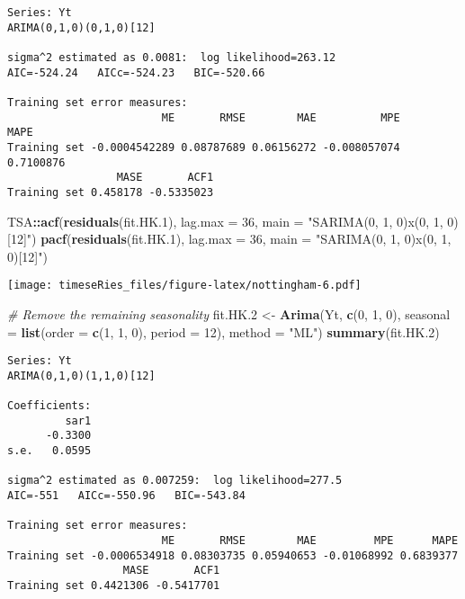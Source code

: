\documentclass[]{book}
\newenvironment{Shaded}{\begin{snugshade}}{\end{snugshade}}
\newcommand{\KeywordTok}[1]{\textcolor[rgb]{0.13,0.29,0.53}{\textbf{#1}}}
\newcommand{\DataTypeTok}[1]{\textcolor[rgb]{0.13,0.29,0.53}{#1}}
\newcommand{\DecValTok}[1]{\textcolor[rgb]{0.00,0.00,0.81}{#1}}
\newcommand{\StringTok}[1]{\textcolor[rgb]{0.31,0.60,0.02}{#1}}
\newcommand{\CommentTok}[1]{\textcolor[rgb]{0.56,0.35,0.01}{\textit{#1}}}
\newcommand{\OperatorTok}[1]{\textcolor[rgb]{0.81,0.36,0.00}{\textbf{#1}}}
\newcommand{\NormalTok}[1]{#1}
\begin{document}
\begin{verbatim}
Series: Yt 
ARIMA(0,1,0)(0,1,0)[12] 

sigma^2 estimated as 0.0081:  log likelihood=263.12
AIC=-524.24   AICc=-524.23   BIC=-520.66

Training set error measures:
                        ME       RMSE        MAE          MPE      MAPE
Training set -0.0004542289 0.08787689 0.06156272 -0.008057074 0.7100876
                 MASE       ACF1
Training set 0.458178 -0.5335023
\end{verbatim}

\begin{Shaded}
\begin{Highlighting}[]
\NormalTok{TSA}\OperatorTok{::}\KeywordTok{acf}\NormalTok{(}\KeywordTok{residuals}\NormalTok{(fit.HK.}\DecValTok{1}\NormalTok{), }\DataTypeTok{lag.max =} \DecValTok{36}\NormalTok{, }\DataTypeTok{main =} \StringTok{"SARIMA(0, 1, 0)x(0, 1, 0)[12]"}\NormalTok{)}
\KeywordTok{pacf}\NormalTok{(}\KeywordTok{residuals}\NormalTok{(fit.HK.}\DecValTok{1}\NormalTok{), }\DataTypeTok{lag.max =} \DecValTok{36}\NormalTok{, }\DataTypeTok{main =} \StringTok{"SARIMA(0, 1, 0)x(0, 1, 0)[12]"}\NormalTok{)}
\end{Highlighting}
\end{Shaded}

\texttt{[image: timeseRies\_files/figure-latex/nottingham-6.pdf]}

\begin{Shaded}
\begin{Highlighting}[]
\CommentTok{# Remove the remaining seasonality}
\NormalTok{fit.HK.}\DecValTok{2}\NormalTok{ <-}\StringTok{ }\KeywordTok{Arima}\NormalTok{(Yt, }\KeywordTok{c}\NormalTok{(}\DecValTok{0}\NormalTok{, }\DecValTok{1}\NormalTok{, }\DecValTok{0}\NormalTok{), }\DataTypeTok{seasonal =} \KeywordTok{list}\NormalTok{(}\DataTypeTok{order =} \KeywordTok{c}\NormalTok{(}\DecValTok{1}\NormalTok{, }\DecValTok{1}\NormalTok{, }\DecValTok{0}\NormalTok{), }\DataTypeTok{period =} \DecValTok{12}\NormalTok{), }
    \DataTypeTok{method =} \StringTok{"ML"}\NormalTok{)}
\KeywordTok{summary}\NormalTok{(fit.HK.}\DecValTok{2}\NormalTok{)}
\end{Highlighting}
\end{Shaded}

\begin{verbatim}
Series: Yt 
ARIMA(0,1,0)(1,1,0)[12] 

Coefficients:
         sar1
      -0.3300
s.e.   0.0595

sigma^2 estimated as 0.007259:  log likelihood=277.5
AIC=-551   AICc=-550.96   BIC=-543.84

Training set error measures:
                        ME       RMSE        MAE         MPE      MAPE
Training set -0.0006534918 0.08303735 0.05940653 -0.01068992 0.6839377
                  MASE       ACF1
Training set 0.4421306 -0.5417701
\end{verbatim}
\end{document}
